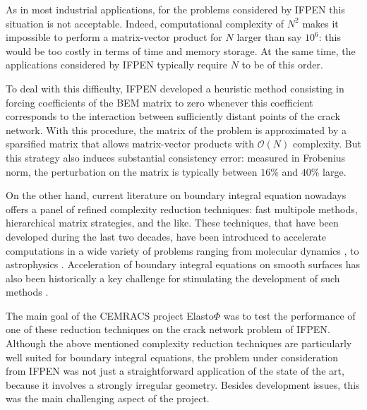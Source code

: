 \bigskip
As in most industrial applications, for the problems considered by IFPEN this situation is not acceptable. 
Indeed, computational complexity of $N^{2}$ makes it impossible to perform a matrix-vector product for $N$ larger than
say $10^{6}$: this would be too costly in terms of time and memory storage. At the same time, the  applications 
considered by IFPEN typically require $N$ to be of this order.

\bigskip
To deal with this difficulty, IFPEN developed a heuristic method consisting in forcing coefficients of the 
BEM matrix to zero whenever this coefficient corresponds to the interaction between sufficiently distant points 
of the crack network. With this procedure, the matrix of the problem is approximated by a sparsified matrix that 
allows matrix-vector products with $\mathcal{O}(N)$ complexity. But this strategy also induces substantial consistency 
error: measured in Frobenius norm, the perturbation on the matrix is typically between $16$\% and $40$\% large.

\bigskip
On the other hand, current literature on boundary integral equation nowadays offers a panel of refined complexity reduction 
techniques: fast multipole methods, hierarchical matrix strategies, and the like. These techniques, that have been developed 
during the last two decades, have been introduced to accelerate computations in a wide variety of problems ranging from molecular 
dynamics \cite{?}, to astrophysics \cite{?}. Acceleration of boundary integral equations on smooth surfaces has also been 
historically a key challenge for stimulating the development of such methods \cite{?}.

\bigskip
The main goal of the CEMRACS project Elasto$\Phi$ was to test the performance of one of these reduction techniques on the 
crack network problem of IFPEN. Although the above mentioned complexity reduction techniques are particularly well suited  
for boundary integral equations, the problem under consideration from IFPEN was not just a straightforward application of 
the state of the art, because it involves a strongly irregular geometry. Besides development issues, this was the main 
challenging  aspect of the project.

